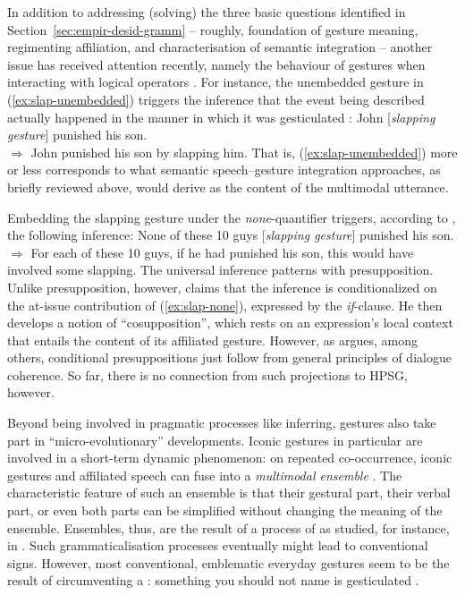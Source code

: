 \documentclass[output=paper,biblatex,babelshorthands,newtxmath,draftmode,colorlinks,citecolor=brown]{langscibook}
\begin{document}
In addition to addressing (solving) the three basic questions identified in Section~\ref{sec:empir-desid-gramm} -- roughly, foundation of gesture meaning, regimenting affiliation, and characterisation of semantic integration -- another issue has received attention recently, namely the  behaviour of gestures when interacting with logical operators \citep{Ebert:2014:a,Schlenker:2018}.
%
For instance, the unembedded gesture in (\ref{ex:slap-unembedded}) triggers the inference that the event being described actually happened in the manner in which it was gesticulated \citep[]{Schlenker:2018}:
%
\ea \label{ex:slap-unembedded}
John [\textit{slapping gesture}] punished his son. \\
$\Rightarrow$ John punished his son by slapping him.
\z
%
That is, (\ref{ex:slap-unembedded}) more or less corresponds to what semantic speech--gesture integration approaches, as briefly reviewed above, would derive as the content of the multimodal utterance.

Embedding the slapping gesture under the \textit{none}-quantifier triggers, according to \citet[]{Schlenker:2018}, the following inference:
%
\ea \label{ex:slap-none}
None of these 10 guys [\textit{slapping gesture}] punished his son. \\
$\Rightarrow$ For each of these 10 guys, if he had punished his son, this would have involved some slapping.
\z
%
The universal inference patterns with presupposition.
%
Unlike presupposition, however, \citet[]{Schlenker:2018} claims that the inference is conditionalized on the at-issue contribution of (\ref{ex:slap-none}), expressed by the \textit{if}-clause. 
%
He then develops a notion of \enquote{cosupposition}, which rests on an expression's local context that entails the content of its affiliated gesture.
%
However, as \citet{Hunter:2019} argues, among others, conditional presuppositions just follow from general principles of dialogue coherence.
%
So far, there is no connection from such projections to HPSG, however.


Beyond being involved in pragmatic processes like inferring, gestures also take part in \enquote{micro-evolutionary} developments.
%
Iconic gestures in particular are involved in a short-term dynamic phenomenon:
%
on repeated co-occurrence, iconic gestures and affiliated speech can fuse into a \emph{multimodal ensemble} \citep{Kendon:2004,Luecking:Mehler:Menke:2008,Mehler:Luecking:2012:d}.
%
The characteristic feature of such an ensemble is that their gestural part, their verbal part, or even both parts can be simplified without changing the meaning of the ensemble.
%
Ensembles, thus, are the result of a process of  as studied, for instance, in  \citep{Galantucci:Garrod:2011}.
%
Such grammaticalisation processes eventually might lead to conventional signs.
%
However, most conventional, emblematic everyday gestures seem to be the result of circumventing a : something you should not name is gesticulated \citep{Posner:2002}.
\end{document}
